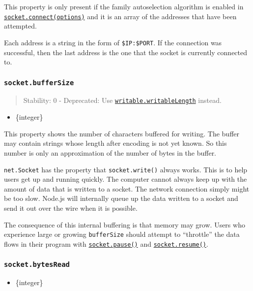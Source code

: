 This property is only present if the family autoselection algorithm is
enabled in
\hyperref[socketconnectoptions-connectlistener]{\texttt{socket.connect(options)}}
and it is an array of the addresses that have been attempted.

Each address is a string in the form of \texttt{\$IP:\$PORT}. If the
connection was successful, then the last address is the one that the
socket is currently connected to.

\subsubsection{\texorpdfstring{\texttt{socket.bufferSize}}{socket.bufferSize}}\label{socket.buffersize}

\begin{quote}
Stability: 0 - Deprecated: Use
\href{stream.md\#writablewritablelength}{\texttt{writable.writableLength}}
instead.
\end{quote}

\begin{itemize}
\tightlist
\item
  \{integer\}
\end{itemize}

This property shows the number of characters buffered for writing. The
buffer may contain strings whose length after encoding is not yet known.
So this number is only an approximation of the number of bytes in the
buffer.

\texttt{net.Socket} has the property that \texttt{socket.write()} always
works. This is to help users get up and running quickly. The computer
cannot always keep up with the amount of data that is written to a
socket. The network connection simply might be too slow. Node.js will
internally queue up the data written to a socket and send it out over
the wire when it is possible.

The consequence of this internal buffering is that memory may grow.
Users who experience large or growing \texttt{bufferSize} should attempt
to ``throttle'' the data flows in their program with
\hyperref[socketpause]{\texttt{socket.pause()}} and
\hyperref[socketresume]{\texttt{socket.resume()}}.

\subsubsection{\texorpdfstring{\texttt{socket.bytesRead}}{socket.bytesRead}}\label{socket.bytesread}

\begin{itemize}
\tightlist
\item
  \{integer\}
\end{itemize}

